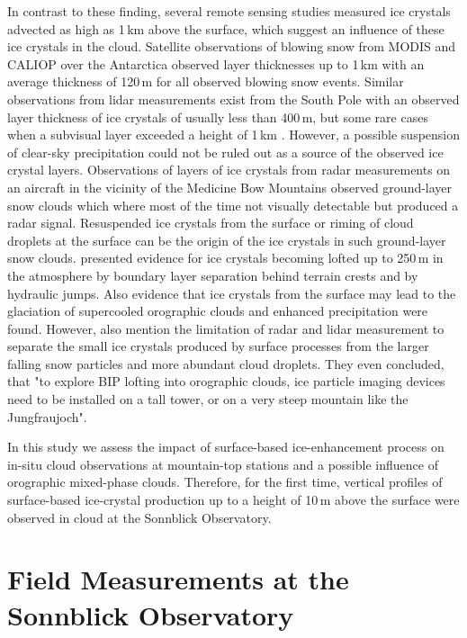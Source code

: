 \documentclass[draft,linenumbers]{agujournal}
\begin{document}
{In contrast to these finding, several remote sensing studies measured ice crystals advected as high as 1\,\si{km} above the surface, which suggest an influence of these ice crystals in the cloud. Satellite observations of blowing snow from MODIS and CALIOP over the Antarctica \citep{Pal01} observed layer thicknesses up to 1\,\si{km} with an average thickness of 120\,\si{m} for all observed blowing snow events. Similar observations from lidar measurements exist from the South Pole with an observed layer thickness of ice crystals of usually less than 400\,\si{m}, but some rare cases when a subvisual layer exceeded a height of 1\,\si{km} \citep{Mah03}. However, a possible suspension of clear-sky precipitation could not be ruled out as a source of the observed ice crystal layers. Observations of layers of ice crystals from radar measurements on an aircraft in the vicinity of the Medicine Bow Mountains \citep{Val12} observed ground-layer snow clouds which where most of the time not visually detectable but produced a radar signal. Resuspended ice crystals from the surface or riming of cloud droplets at the surface can be the origin of the ice crystals in such ground-layer snow clouds. \citet{Gee15} presented evidence for ice crystals becoming lofted up to 250\,\si{m} in the atmosphere by boundary layer separation behind terrain crests and by hydraulic jumps. Also evidence that ice crystals from the surface may lead to the glaciation of supercooled orographic clouds and enhanced precipitation were found. However, \citet{Gee15} also mention the limitation of radar and lidar measurement to separate the small ice crystals produced by surface processes from the larger falling snow particles and more abundant cloud droplets. They even concluded, that "to explore BIP lofting into orographic clouds, ice particle imaging devices need to be installed on a tall tower, or on a very steep mountain like the Jungfraujoch".

In this study we assess the impact of surface-based ice-enhancement process on in-situ cloud observations at mountain-top stations and a possible influence of orographic mixed-phase clouds. Therefore, for the first time, vertical profiles of surface-based ice-crystal production up to a height of 10\,\si{m} above the surface were observed in cloud at the Sonnblick Observatory. 
 
\section{Field Measurements at the Sonnblick Observatory}
\label{sectionMeasurementSite}

}
\end{document}
